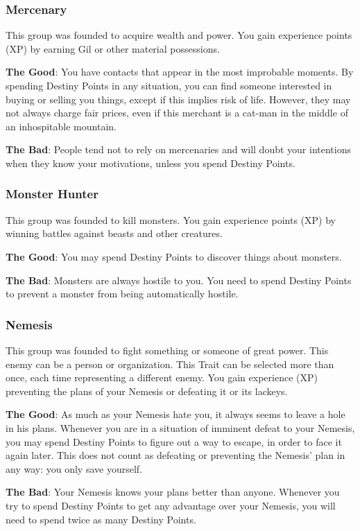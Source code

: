 \begin{multicols}{2}
\subsubsection{Mercenary}
This group was founded to acquire wealth and power. You gain experience points (XP) by earning Gil or other material possessions.

\textbf{The Good}: You have contacts that appear in the most improbable moments. By spending Destiny Points in any situation, you can find someone interested in buying or selling you things, except if this implies risk of life. However, they may not always charge fair prices, even if this merchant is a cat-man in the middle of an inhospitable mountain.

\textbf{The Bad}: People tend not to rely on mercenaries and will doubt your intentions when they know your motivations, unless you spend Destiny Points.

\subsubsection{Monster Hunter}
This group was founded to kill monsters. You gain experience points (XP) by winning battles against beasts and other creatures.

\textbf{The Good}: You may spend Destiny Points to discover things about monsters.

\textbf{The Bad}: Monsters are always hostile to you. You need to spend Destiny Points to prevent a monster from being automatically hostile.

\subsubsection{Nemesis}
This group was founded to fight something or someone of great power. This enemy can be a person or organization. This Trait can be selected more than once, each time representing a different enemy. You gain experience (XP) preventing the plans of your Nemesis or defeating it or its lackeys.

\textbf{The Good}: As much as your Nemesis hate you, it always seems to leave a hole in his plans. Whenever you are in a situation of imminent defeat to your Nemesis, you may spend Destiny Points to figure out a way to escape, in order to face it again later. This does not count as defeating or preventing the Nemesis’ plan in any way: you only save yourself.

\textbf{The Bad}: Your Nemesis knows your plans better than anyone. Whenever you try to spend Destiny Points to get any advantage over your Nemesis, you will need to spend twice as many Destiny Points.


\end{multicols}

